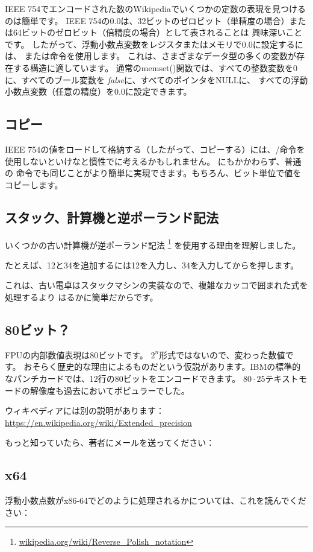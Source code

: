 IEEE 754でエンコードされた数のWikipediaでいくつかの定数の表現を見つけるのは簡単です。 
IEEE 754の0.0は、32ビットのゼロビット（単精度の場合）または64ビットのゼロビット（倍精度の場合）として表されることは
興味深いことです。
したがって、浮動小数点変数をレジスタまたはメモリで0.0に設定するには、 \MOV または命令を使用します。
これは、さまざまなデータ型の多くの変数が存在する構造に適しています。
通常のmemset()関数では、すべての整数変数を0に、すべてのブール変数を \emph{false}に、すべてのポインタをNULLに、
すべての浮動小数点変数（任意の精度）を0.0に設定できます。

\subsection{コピー}

IEEE 754の値をロードして格納する（したがって、コピーする）には、/命令を使用しないといけなと慣性でに考えるかもしれません。
にもかかわらず、普通の \MOV 命令でも同じことがより簡単に実現できます。もちろん、ビット単位で値をコピーします。

\subsection{スタック、計算機と逆ポーランド記法}


いくつかの古い計算機が逆ポーランド記法
\footnote{\href{http://go.yurichev.com/17354}{wikipedia.org/wiki/Reverse\_Polish\_notation}}
を使用する理由を理解しました。

たとえば、12と34を追加するには12を入力し、34を入力してからを押します。

これは、古い電卓はスタックマシンの実装なので、複雑なカッコで囲まれた式を処理するより
はるかに簡単だからです。


\subsection{80ビット？}

FPUの内部数値表現は80ビットです。
$2^n$形式ではないので、変わった数値です。
おそらく歴史的な理由によるものだという仮説があります。IBMの標準的なパンチカードでは、12行の80ビットをエンコードできます。 
$80\cdot 25$テキストモードの解像度も過去においてポピュラーでした。

ウィキペディアには別の説明があります：\url{https://en.wikipedia.org/wiki/Extended_precision}

もっと知っていたら、著者にメールを送ってください： \EMAIL{}

\subsection{x64}

浮動小数点数がx86-64でどのように処理されるかについては、これを読んでください：


